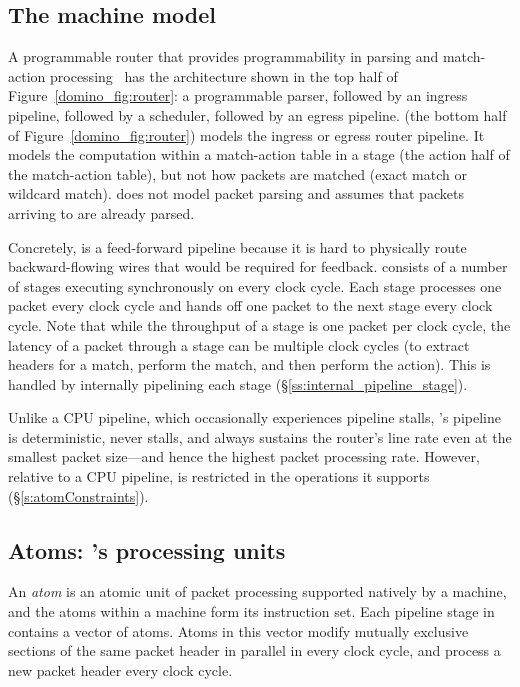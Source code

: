 \subsection{The \absmachine machine model}

A programmable router that provides programmability in parsing and match-action
processing~\cite{rmt, xpliant, flexpipe, tofino} has the architecture shown in
the top half of Figure~\ref{domino_fig:router}: a programmable parser, followed
by an ingress pipeline, followed by a scheduler, followed by an egress
pipeline.  \absmachine (the bottom half of Figure~\ref{domino_fig:router})
models the ingress or egress router pipeline.  It models the computation within
a match-action table in a stage (\ie the action half of the match-action
table), but not how packets are matched (\eg exact match or wildcard match).
\absmachine does not model packet parsing and assumes that packets arriving to
\absmachine are already parsed.

 Concretely, \absmachine is a feed-forward pipeline because it is hard to
physically route backward-flowing wires that would be required for feedback.
\absmachine consists of a number of stages executing synchronously on every
clock cycle.  Each stage processes one packet every clock cycle and hands off
one packet to the next stage every clock cycle. Note that while the throughput
of a stage is one packet per clock cycle, the latency of a packet through a
stage can be multiple clock cycles (to extract headers for a match, perform the
match, and then perform the action). This is handled by internally pipelining
each \absmachine stage (\S\ref{ss:internal_pipeline_stage}).

Unlike a CPU pipeline, which occasionally experiences pipeline stalls,
\absmachine's pipeline is deterministic, never stalls, and always sustains the
router's line rate even at the smallest packet size---and hence the highest
packet processing rate. However, relative to a CPU pipeline, \absmachine is
restricted in the operations it supports (\S\ref{s:atomConstraints}).

\subsection{Atoms: \absmachine's processing units}
\label{ss:atoms}
 An {\em atom} is an atomic unit of packet processing supported natively by a
\absmachine machine, and the atoms within a \absmachine machine form its
instruction set. Each pipeline stage in \absmachine contains a vector of atoms.
Atoms in this vector modify mutually exclusive sections of the same packet
header in parallel in every clock cycle, and process a new packet header every
clock cycle.

